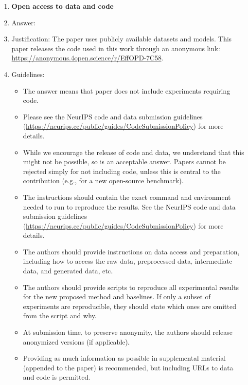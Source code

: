 \documentclass{article}
\begin{document}
\begin{enumerate}
\item {\bf Open access to data and code}
    \item[] Answer: \answerYes{}
    \item[] Justification: The paper uses publicly available datasets and models. This paper releases the code used in this work through an anonymous link: \href{https://anonymous.4open.science/r/EffOPD-7C58/README.md}{https://anonymous.4open.science/r/EffOPD-7C58}.
    \item[] Guidelines:
    \begin{itemize}
        \item The answer \answerNA{} means that paper does not include experiments requiring code.
        \item Please see the NeurIPS code and data submission guidelines (\url{https://neurips.cc/public/guides/CodeSubmissionPolicy}) for more details.
        \item While we encourage the release of code and data, we understand that this might not be possible, so \answerNo{} is an acceptable answer. Papers cannot be rejected simply for not including code, unless this is central to the contribution (e.g., for a new open-source benchmark).
        \item The instructions should contain the exact command and environment needed to run to reproduce the results. See the NeurIPS code and data submission guidelines (\url{https://neurips.cc/public/guides/CodeSubmissionPolicy}) for more details.
        \item The authors should provide instructions on data access and preparation, including how to access the raw data, preprocessed data, intermediate data, and generated data, etc.
        \item The authors should provide scripts to reproduce all experimental results for the new proposed method and baselines. If only a subset of experiments are reproducible, they should state which ones are omitted from the script and why.
        \item At submission time, to preserve anonymity, the authors should release anonymized versions (if applicable).
        \item Providing as much information as possible in supplemental material (appended to the paper) is recommended, but including URLs to data and code is permitted.
    \end{itemize}


\end{enumerate}
\end{document}
